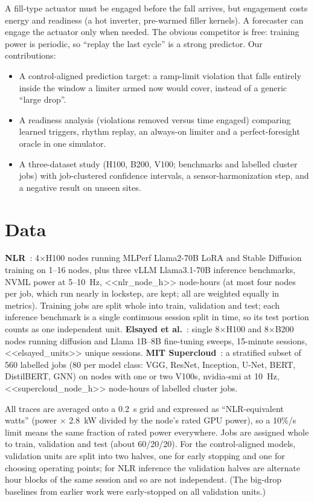 \documentclass[conference]{IEEEtran}
\begin{document}
A fill-type actuator must be engaged before the fall arrives, but engagement costs energy and readiness
(a hot inverter, pre-warmed filler kernels). A forecaster can engage the actuator only when needed. The
obvious competitor is free: training power is periodic, so ``replay the last cycle'' is a strong
predictor. Our contributions:
\begin{itemize}
\item A control-aligned prediction target: a ramp-limit violation that falls entirely inside the window
a limiter armed now would cover, instead of a generic ``large drop''.
\item A readiness analysis (violations removed versus time engaged) comparing learned triggers, rhythm
replay, an always-on limiter and a perfect-foresight oracle in one simulator.
\item A three-dataset study (H100, B200, V100; benchmarks and labelled cluster jobs) with job-clustered confidence
intervals, a sensor-harmonization step, and a negative result on unseen sites.
\end{itemize}

\section{Data}
\textbf{NLR}~\cite{nlr}: 4$\times$H100 nodes running MLPerf Llama2-70B LoRA and Stable Diffusion
training on 1--16 nodes, plus three vLLM Llama3.1-70B inference benchmarks, NVML power at 5--10~Hz,
<<nlr_node_h>> node-hours (at most four nodes per job, which run nearly in lockstep, are kept; all
are weighted equally in metrics). Training jobs are split whole into train, validation and test; each
inference benchmark is a single continuous session split in time, so its test portion counts as one
independent unit. \textbf{Elsayed et al.}~\cite{elsayed}: single 8$\times$H100 and 8$\times$B200 nodes
running diffusion and Llama 1B--8B fine-tuning sweeps, 15-minute sessions, <<elsayed_units>> unique
sessions. \textbf{MIT Supercloud}~\cite{supercloud}: a stratified subset of 560 labelled jobs (80 per
model class: VGG, ResNet, Inception, U-Net, BERT, DistilBERT, GNN) on nodes with one or two V100s,
nvidia-smi at 10~Hz, <<supercloud_node_h>> node-hours of labelled cluster jobs.

All traces are averaged onto a 0.2~s grid and expressed as ``NLR-equivalent watts'' (power $\times$
2.8~kW divided by the node's rated GPU power), so a 10\%/s limit means the same fraction of rated power
everywhere. Jobs are assigned whole to train, validation and test (about 60/20/20). For the
control-aligned models, validation units are split into two halves, one for early stopping and one for
choosing operating points; for NLR inference the validation halves are alternate hour blocks of the
same session and so are not independent. (The big-drop baselines from earlier work were early-stopped on all
validation units.)
\end{document}
